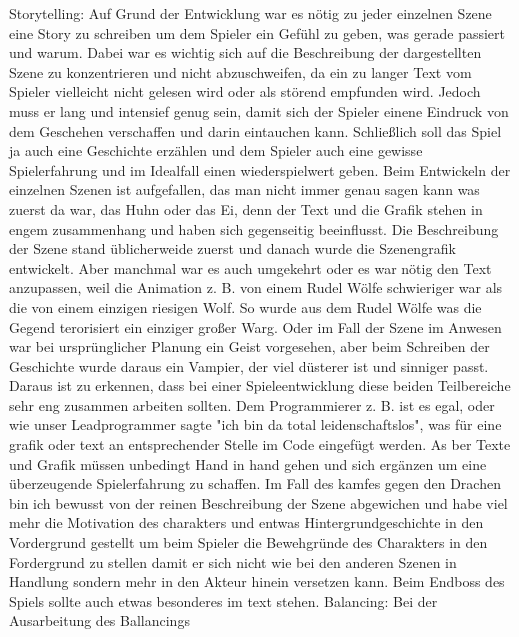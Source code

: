 Storytelling: Auf Grund der Entwicklung war es nötig zu jeder einzelnen Szene eine Story zu schreiben um dem Spieler ein Gefühl zu geben, was gerade passiert und warum.
Dabei war es wichtig sich auf die Beschreibung der dargestellten Szene zu konzentrieren und nicht abzuschweifen, da ein zu langer Text vom Spieler vielleicht nicht gelesen wird oder als störend empfunden wird. Jedoch muss er lang und intensief genug sein, damit sich der Spieler einene Eindruck von dem Geschehen verschaffen und darin eintauchen kann. Schließlich soll das Spiel ja auch eine Geschichte erzählen und dem Spieler auch eine gewisse Spielerfahrung und im Idealfall einen wiederspielwert geben. Beim Entwickeln der einzelnen Szenen ist aufgefallen, das man nicht immer genau sagen kann was zuerst da war, das Huhn oder das Ei, denn der Text und die Grafik stehen in engem zusammenhang und haben sich gegenseitig beeinflusst. Die Beschreibung der Szene stand üblicherweide zuerst und danach wurde die Szenengrafik entwickelt. Aber manchmal war es auch umgekehrt oder es war nötig den Text anzupassen, weil die Animation z. B. von einem Rudel Wölfe schwieriger war als die von einem einzigen riesigen Wolf. So wurde aus dem Rudel Wölfe was die Gegend terorisiert ein einziger großer Warg. Oder im Fall der Szene im Anwesen war bei ursprünglicher Planung ein Geist vorgesehen, aber beim Schreiben der Geschichte wurde daraus ein Vampier, der viel düsterer ist und sinniger passt. Daraus ist zu erkennen, dass bei einer Spieleentwicklung diese beiden Teilbereiche sehr eng zusammen arbeiten sollten. Dem Programmierer z. B. ist es egal, oder wie unser Leadprogrammer sagte "ich bin da total leidenschaftslos", was für eine grafik oder text an entsprechender Stelle im Code eingefügt werden. As ber Texte und Grafik müssen unbedingt Hand in hand gehen und sich ergänzen um eine überzeugende Spielerfahrung zu schaffen. Im Fall des kamfes gegen den Drachen bin ich bewusst von der reinen Beschreibung der Szene abgewichen und habe viel mehr die Motivation des charakters und entwas Hintergrundgeschichte in den Vordergrund gestellt um beim Spieler die Bewehgründe des Charakters in den Fordergrund zu stellen damit er sich nicht wie bei den anderen Szenen in Handlung sondern mehr in den Akteur hinein versetzen kann. Beim Endboss des Spiels sollte auch etwas besonderes im text stehen.
Balancing: Bei der Ausarbeitung des Ballancings 